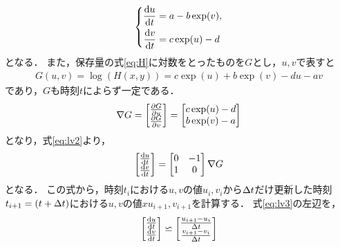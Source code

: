 \begin{align}
    \left\{
        \begin{aligned}
            \label{eq:lv2}
            \frac{\mathrm{d}u}{\mathrm{d}t} &= a - b \exp(v), \\
            \frac{\mathrm{d}v}{\mathrm{d}t} &= c \exp(u) - d
        \end{aligned}
    \right.
\end{align}
となる．
また，保存量の式\eqref{eq:H}に対数をとったものを$G$とし，$u,v$で表すと
\begin{align}
    G(u,v) = \log\left(H(x,y)\right)  = c\exp(u) + b\exp(v) - du -av
\end{align}
であり，$G$も時刻$t$によらず一定である．
\begin{align}
    \nabla G = \begin{bmatrix}
        \frac{\partial G}{\partial u} \\
        \frac{\partial G}{\partial v}
    \end{bmatrix} =
    \begin{bmatrix}
        c\exp(u) - d \\
        b\exp(v) - a
    \end{bmatrix}
\end{align}
となり，式\eqref{eq:lv2}より，
\begin{align}
    \label{eq:lv3}
    \begin{bmatrix}
        \frac{\mathrm{d}u}{\mathrm{d}t} \\ 
        \frac{\mathrm{d}v}{\mathrm{d}t}
    \end{bmatrix}
    = 
    \begin{bmatrix}
        0 & -1 \\
        1 & 0
    \end{bmatrix}
    \nabla G
\end{align}
となる． 
この式から，時刻$t_i$における$u,v$の値$u_i,v_i$から$\Delta t$だけ更新した時刻$t_{i+1} = (t + \Delta t)$における$u,v$の値$xu_{i+1},v_{i+1}$を計算する．
式\eqref{eq:lv3}の左辺を，
\begin{align}
    \label{eq:lv4}
    \begin{bmatrix}
        \frac{\mathrm{d}u}{\mathrm{d}t} \\ 
        \frac{\mathrm{d}v}{\mathrm{d}t}
    \end{bmatrix}
     \backsimeq 
    \begin{bmatrix}
        \frac{u_{i+1} - u_i}{\Delta t} \\
         \frac{v_{i+1} - v_i}{\Delta t}
    \end{bmatrix}
\end{align}
